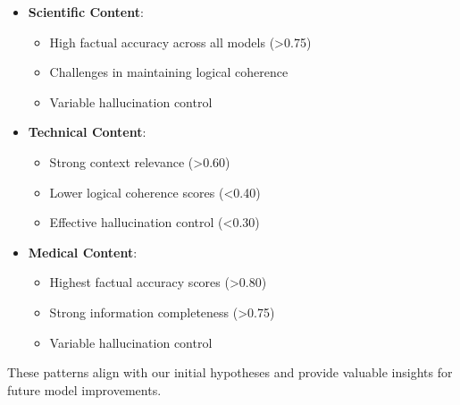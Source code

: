 \begin{itemize}
    \item \textbf{Scientific Content}:
    \begin{itemize}
        \item High factual accuracy across all models (>0.75)
        \item Challenges in maintaining logical coherence
        \item Variable hallucination control
    \end{itemize}
    
    \item \textbf{Technical Content}:
    \begin{itemize}
        \item Strong context relevance (>0.60)
        \item Lower logical coherence scores (<0.40)
        \item Effective hallucination control (<0.30)
    \end{itemize}
    
    \item \textbf{Medical Content}:
    \begin{itemize}
        \item Highest factual accuracy scores (>0.80)
        \item Strong information completeness (>0.75)
        \item Variable hallucination control
    \end{itemize}
\end{itemize}

These patterns align with our initial hypotheses and provide valuable insights for future model improvements.
